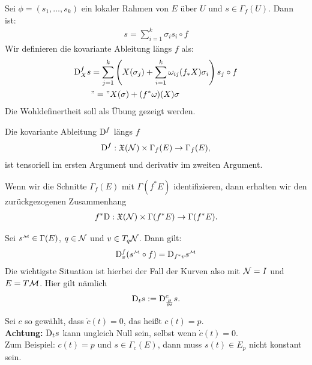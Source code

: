 \begin{defs}
Sei $\phi = (s_1, \dots, s_k)$ ein lokaler Rahmen von $E$ über $U$ und $s \in \Gamma_f (U)$. 
Dann ist:
\begin{align}
s = \sum^{k}_{i=1} \sigma_i s_i \circ f
\end{align}
Wir definieren die kovariante Ableitung längs $f$ als:
\begin{align}
\mathrm{D}^{f}_X s &= \sum^k_{j=1} \left( X(\sigma_j) + \sum^k_{i=1} \omega_{ij}(f_\ast X)\sigma_i \right) s_j \circ f\\
&"=" X(\sigma) + (f^\ast \omega)(X) \sigma
\end{align}
Die Wohldefinertheit soll als Übung gezeigt werden.
\end{defs}
\begin{satz}
Die kovariante Ableitung $\mathrm{D}^f$ längs $f$
\begin{align}
\mathrm{D}^f: \mathfrak{X}(\mathcal{N}) \times \Gamma_f (E) \to \Gamma_f (E),
\end{align}
ist tensoriell im ersten Argument und derivativ im zweiten Argument.
\end{satz}
Wenn wir die Schnitte $\Gamma_f (E)$ mit $\Gamma(f^\ast E)$ identifizieren, dann erhalten wir den zurückgezogenen Zusammenhang
\begin{align}
f^\ast \mathrm{D} : \mathfrak{X}(\mathcal{N}) \times\Gamma(f^\ast E) \to \Gamma(f^\ast E).
\end{align}
\begin{satz}
Sei $s^\text{{\begin{tiny}$\mfk$\end{tiny}}} \in \Gamma(E)$, $q \in \mathcal{N}$ und $v\in T_q \mathcal{N}$.
Dann gilt:
\begin{align}
\covd^f_v (s^\text{{\begin{tiny}$\mfk$\end{tiny}}} \circ f) = \covd_{f^\ast v} s^\text{{\begin{tiny}$\mfk$\end{tiny}}}
\end{align}
Die wichtigste Situation ist hierbei der Fall der Kurven also mit $\mathcal{N} = I$ und $E = T\mathcal{M}$.
Hier gilt nämlich
\begin{align}
\mathrm{D}_t s := \mathrm{D}^c_{\pdv{t}} s.
\end{align}
\end{satz}
\begin{bem}
Sei $c$ so gewählt, dass $\dot{c}(t) = 0$, das heißt $c(t)=p$.\\
\textbf{Achtung:} $\mathrm{D}_t s$ kann ungleich Null sein, selbst wenn $\dot{c}(t) = 0$.\\
Zum Beispiel: $c(t)=p$ und $s \in \Gamma_c (E)$, dann muss $s(t) \in E_p$ nicht konstant sein.
\end{bem}
